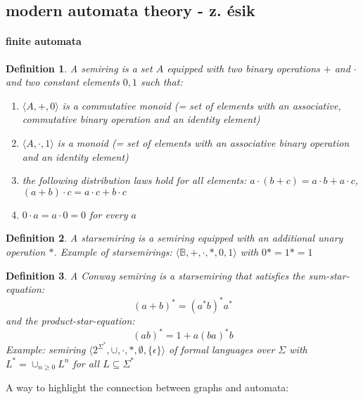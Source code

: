 \documentclass[]{article}
\newtheorem{definition}{Definition}
\begin{document}
\subsection{modern automata theory - z. \'esik}

\paragraph{finite automata} 
\begin{definition}
    A semiring is a set $A$ equipped with two binary operations $+$ and $\cdot$ and two constant elements $0,1$ such that:
    \begin{enumerate}
        \item $\langle A, +, 0\rangle$ is a commutative monoid (= set of elements with an associative, commutative binary operation and an identity element)
        \item $\langle A, \cdot, 1\rangle$ is a monoid (= set of elements with an associative binary operation and an identity element)
        \item the following distribution laws hold for all elements: $a \cdot (b+c) = a \cdot b + a \cdot c$, $(a + b)\cdot c = a\cdot c + b\cdot c$
        \item $0\cdot a = a\cdot 0 = 0$ for every $a$
    \end{enumerate}
\end{definition}

\begin{definition}
    A starsemiring is a semiring equipped with an additional unary operation $*$. Example of starsemirings: $\langle \mathbb{B}, +, \cdot, *, 0, 1 \rangle$ with $0*=1*=1$
\end{definition}

\begin{definition}
    A Conway semiring is a starsemiring that satisfies the sum-star-equation:
    \begin{equation}
        (a+b)^* = (a^*b)^*a^*
    \end{equation}
     and the product-star-equation:
    \begin{equation}
        (ab)^* = 1 + a(ba)^*b
    \end{equation}
     Example: semiring $\langle 2^{\Sigma^*}, \cup, \cdot, *, \emptyset, \{ \epsilon \} \rangle$ of formal languages over $\Sigma$ with $L^*=\cup_{n\geq 0}L^n$ for all $L \subseteq \Sigma^*$
\end{definition}

A way to highlight the connection between graphs and automata:
\end{document}

